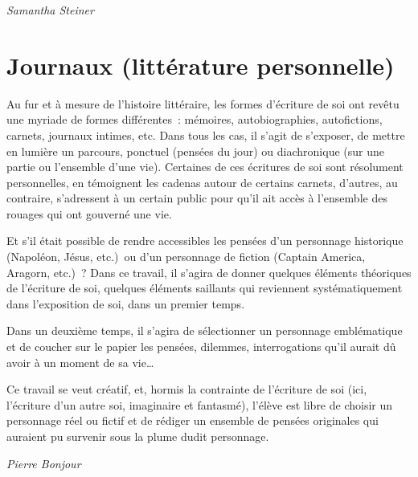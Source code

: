 \documentclass[
  10pt,
  french,
  a5paper,
  openany]{book}
\newenvironment{signature}{\begin{flushright}}{\end{flushright}}
\begin{document}
\begin{signature}
\emph{Samantha Steiner}

\end{signature}

\hypertarget{journaux-littuxe9rature-personnelle}{%
\chapter{Journaux (littérature personnelle)}\label{journaux-littuxe9rature-personnelle}}

Au fur et à mesure de l'histoire littéraire, les formes d'écriture de soi ont revêtu une myriade de formes différentes~: mémoires, autobiographies, autofictions, carnets, journaux intimes, etc. Dans tous les cas, il s'agit de s'exposer, de mettre en lumière un parcours, ponctuel (pensées du jour) ou diachronique (sur une partie ou l'ensemble d'une vie). Certaines de ces écritures de soi sont résolument personnelles, en témoignent les cadenas autour de certains carnets, d'autres, au contraire, s'adressent à un certain public pour qu'il ait accès à l'ensemble des rouages qui ont gouverné une vie.

Et s'il était possible de rendre accessibles les pensées d'un personnage historique (Napoléon, Jésus, etc.)~ou d'un personnage de fiction (Captain America, Aragorn, etc.)~? Dans ce travail, il s'agira de donner quelques éléments théoriques de l'écriture de soi, quelques éléments saillants qui reviennent systématiquement dans l'exposition de soi, dans un premier temps.

Dans un deuxième temps, il s'agira de sélectionner un personnage emblématique et de coucher sur le papier les pensées, dilemmes, interrogations qu'il aurait dû avoir à un moment de sa vie\ldots{}

Ce travail se veut créatif, et, hormis la contrainte de l'écriture de soi (ici, l'écriture d'un autre soi, imaginaire et fantasmé), l'élève est libre de choisir un personnage réel ou fictif et de rédiger un ensemble de pensées originales qui auraient pu survenir sous la plume dudit personnage.

\begin{signature}
\emph{Pierre Bonjour}

\end{signature}
\end{document}
